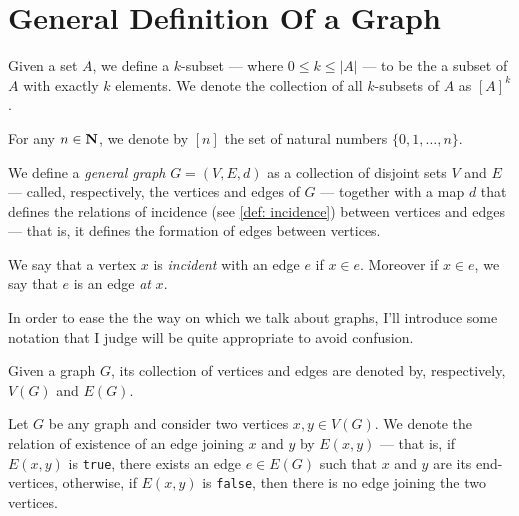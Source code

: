 \section{General Definition Of a Graph}

\begin{notation}[\(k\)-subsets]
Given a set \(A\), we define a \(k\)-subset --- where \(0 \leq k \leq |A|\)
--- to be the a subset of \(A\) with exactly \(k\) elements. We denote the
collection of all \(k\)-subsets of \(A\) as \([A]^k\).
\end{notation}

\begin{notation}[Range]
For any \(n \in \mathbf{N}\), we denote by \([n]\) the set of natural numbers \(\{0,
1, \dots, n\}\).
\end{notation}

\begin{definition}\label{def: general-graph}
We define a \emph{general graph} \(G = (V, E, d)\) as a collection of disjoint
sets \(V\) and \(E\) --- called, respectively, the vertices and edges of \(G\) ---
together with a map \(d\) that defines the relations of incidence (see
\cref{def: incidence}) between vertices and edges --- that is, it defines the
formation of edges between vertices.
\end{definition}

\begin{definition}[Incidence]\label{def: incidence}
We say that a vertex \(x\) is \emph{incident} with an edge \(e\) if \(x \in
e\). Moreover if \(x \in e\), we say that \(e\) is an edge \emph{at} \(x\).
\end{definition}

In order to ease the the way on which we talk about graphs, I'll introduce some
notation that I judge will be quite appropriate to avoid confusion.

\begin{notation}
Given a graph \(G\), its collection of vertices and edges are denoted by,
respectively, \(V(G)\) and \(E(G)\).
\end{notation}

\begin{notation}
Let \(G\) be any graph and consider two vertices \(x, y \in V(G)\). We denote
the relation of existence of an edge joining \(x\) and \(y\) by \(E(x, y)\) ---
that is, if \(E(x, y)\) is \texttt{true}, there exists an edge \(e \in E(G)\) such
that \(x\) and \(y\) are its end-vertices, otherwise, if \(E(x, y)\) is
\texttt{false}, then there is no edge joining the two vertices.
\end{notation}

